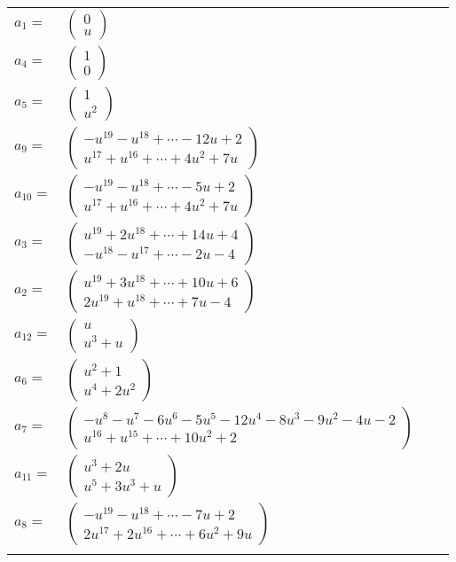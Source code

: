 \documentclass[1p]{elsarticle_modified}
\theoremstyle{definition}
\begin{document}
\begin{tabular}{m{7pt} m{180pt} m{7pt} m{180pt} }
\flushright $a_{1}=$&$\begin{pmatrix}0\\u\end{pmatrix}$ \\
\flushright $a_{4}=$&$\begin{pmatrix}1\\0\end{pmatrix}$ \\
\flushright $a_{5}=$&$\begin{pmatrix}1\\u^2\end{pmatrix}$ \\
\flushright $a_{9}=$&$\begin{pmatrix}- u^{19}- u^{18}+\cdots-12 u+2\\u^{17}+u^{16}+\cdots+4 u^2+7 u\end{pmatrix}$ \\
\flushright $a_{10}=$&$\begin{pmatrix}- u^{19}- u^{18}+\cdots-5 u+2\\u^{17}+u^{16}+\cdots+4 u^2+7 u\end{pmatrix}$ \\
\flushright $a_{3}=$&$\begin{pmatrix}u^{19}+2 u^{18}+\cdots+14 u+4\\- u^{18}- u^{17}+\cdots-2 u-4\end{pmatrix}$ \\
\flushright $a_{2}=$&$\begin{pmatrix}u^{19}+3 u^{18}+\cdots+10 u+6\\2 u^{19}+u^{18}+\cdots+7 u-4\end{pmatrix}$ \\
\flushright $a_{12}=$&$\begin{pmatrix}u\\u^3+u\end{pmatrix}$ \\
\flushright $a_{6}=$&$\begin{pmatrix}u^2+1\\u^4+2 u^2\end{pmatrix}$ \\
\flushright $a_{7}=$&$\begin{pmatrix}- u^8- u^7-6 u^6-5 u^5-12 u^4-8 u^3-9 u^2-4 u-2\\u^{16}+u^{15}+\cdots+10 u^2+2\end{pmatrix}$ \\
\flushright $a_{11}=$&$\begin{pmatrix}u^3+2 u\\u^5+3 u^3+u\end{pmatrix}$ \\
\flushright $a_{8}=$&$\begin{pmatrix}- u^{19}- u^{18}+\cdots-7 u+2\\2 u^{17}+2 u^{16}+\cdots+6 u^2+9 u\end{pmatrix}$\\&\end{tabular}
\end{document}
